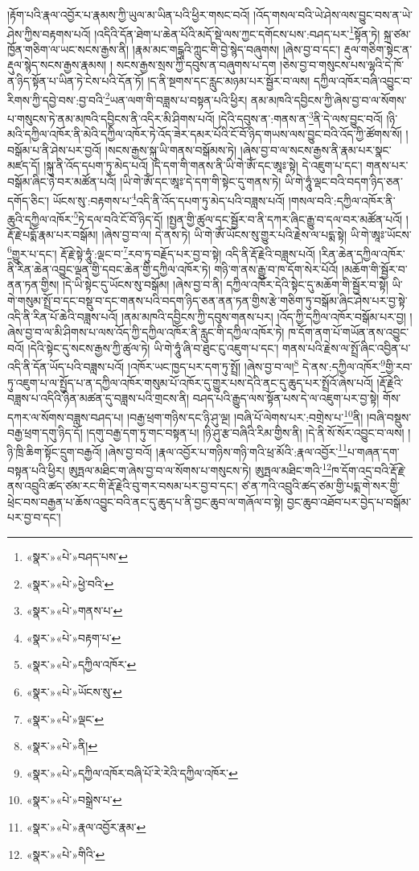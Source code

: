 །རྟོག་པའི་རྣལ་འབྱོར་པ་རྣམས་ཀྱི་ཡུལ་མ་ཡིན་པའི་ཕྱིར་གསང་བའོ། །འོད་གསལ་བའི་ཡེ་ཤེས་ལས་བྱུང་བས་ན་ཡེ་ཤེས་ཀྱིས་བརྟགས་པའོ། །འདིའི་དོན་ཐེག་པ་ཆེན་པོའི་མདོ་སྡེ་ལས་ཀྱང་དགོངས་པས་:བཤད་པར་\footnote{«སྣར་»«པེ་»བཤད་པས་}སྟོན་ཏེ། སྐྲ་ཙམ་ཁྱོན་གཅིག་ལ་ཡང་སངས་རྒྱས་ནི། །རྣམ་མང་གངྒཱའི་ཀླུང་གི་བྱེ་སྙེད་བཞུགས། །ཞེས་བྱ་བ་དང་། རྡུལ་གཅིག་སྟེང་ན་རྡུལ་སྙེད་སངས་རྒྱས་རྣམས། །
སངས་རྒྱས་སྲས་ཀྱི་དབུས་ན་བཞུགས་པ་དག །ཅེས་བྱ་བ་གསུངས་པས་ལྷའི་དེ་ཁོ་ན་ཉིད་སྟོན་པ་ཡིན་ཏེ་ངེས་པའི་དོན་ཏོ། །ད་ནི་སྔགས་དང་རླུང་མཉམ་པར་སྦྱོར་བ་ལས། དཀྱིལ་འཁོར་བཞི་འབྱུང་བ་རིགས་ཀྱི་དབྱེ་བས་:བྱ་བའི་\footnote{«སྣར་»«པེ་»ཕྱེ་བའི་}ཡན་ལག་གི་བཟླས་པ་བསྟན་པའི་ཕྱིར། ནམ་མཁའི་དབྱིངས་ཀྱི་ཞེས་བྱ་བ་ལ་སོགས་པ་གསུངས་ཏེ་ནམ་མཁའི་དབྱིངས་ནི་འདིར་མི་ཤིགས་པའོ། །དེའི་དབུས་ན་:གནས་ན་\footnote{«སྣར་»«པེ་»གནས་པ་}ནི་དེ་ལས་བྱུང་བའོ། །ཉི་མའི་དཀྱིལ་འཁོར་ནི་མེའི་དཀྱིལ་འཁོར་ཏེ་འོད་ཟེར་དམར་པོའི་ངོ་བོ་ཉིད་གཡས་ལས་བྱུང་བའི་འོད་ཀྱི་ཚོགས་སོ། །བསྒོམ་པ་ནི་ཤེས་པར་བྱའོ། །སངས་རྒྱས་སྐུ་ཡི་གནས་བསྒོམས་ཏེ། །ཞེས་བྱ་བ་ལ་སངས་རྒྱས་ནི་རྣམ་པར་སྣང་མཛད་དོ། །སྐུ་ནི་འོད་དཔག་ཏུ་མེད་པའོ། །དེ་དག་གི་གནས་ནི་ཡི་གེ་ཨོཾ་དང་ཨཱཿ་སྟེ། དེ་འཇུག་པ་དང་། གནས་པར་བསྒོམ་ཞིང་ཉེ་བར་མཚོན་པའོ། །ཡི་གེ་ཨོཾ་དང་ཨཱཿ་དེ་དག་གི་སྟེང་དུ་གནས་ཏེ། ཡི་གེ་ཧཱུཾ་ལྡང་བའི་བདག་ཉིད་ཅན་དགོད་ཅིང་། ཡོངས་སུ་:བརྟགས་པ་\footnote{«སྣར་»«པེ་»བརྟག་པ་}འདི་ནི་འོད་དཔག་ཏུ་མེད་པའི་བཟླས་པའོ། །གསལ་བའི་:དཀྱིལ་འཁོར་ནི་ཆུའི་དཀྱིལ་འཁོར་\footnote{«སྣར་»«པེ་»དཀྱིལ་འཁོར་}ཏེ་དལ་བའི་ངོ་བོ་ཉིད་དོ། །སྤྱན་གྱི་ཚུལ་དང་སྦྱོར་བ་ནི་དཀར་ཞིང་རྒྱུ་བ་དལ་བར་མཚོན་པའོ། །རྡོ་རྗེ་པདྨོ་རྣམ་པར་བསྒོམ། །ཞེས་བྱ་བ་ལ། དེ་ནས་ཏེ། ཡི་གེ་ཨོཾ་ཡོངས་སུ་གྱུར་པའི་རྗེས་ལ་པདྨ་སྟེ། ཡི་གེ་ཨཱཿ་ཡོངས་\footnote{«སྣར་»«པེ་»ཡོངས་སུ་}གྱུར་པ་དང་། རྡོ་རྗེ་སྟེ་ཧཱུཾ་:ལྡང་བ་\footnote{«སྣར་»«པེ་»ལྡང་}རབ་ཏུ་བརྗོད་པར་བྱ་བ་སྟེ། འདི་ནི་རྡོ་རྗེའི་བཟླས་པའོ། །རིན་ཆེན་དཀྱིལ་འཁོར་ནི་རིན་ཆེན་འབྱུང་ལྡན་གྱི་དབང་ཆེན་གྱི་དཀྱིལ་འཁོར་ཏེ། གཉི་ག་ནས་རྒྱུ་བ་ཁ་དོག་སེར་པོའོ། །མཆོག་གི་སྦྱོར་བ་ནན་ཏན་གྱིས། །དེ་ཡི་སྟེང་དུ་ཡོངས་སུ་བསྒོམ། །ཞེས་བྱ་བ་ནི། དཀྱིལ་འཁོར་དེའི་སྟེང་དུ་མཆོག་གི་སྦྱོར་བ་སྟེ། ཡི་གེ་གསུམ་སྤྲོ་བ་དང་བསྡུ་བ་དང་གནས་པའི་བདག་ཉིད་ཅན་ནན་ཏན་གྱིས་རྩེ་གཅིག་ཏུ་བསྒོམ་ཞིང་ཤེས་པར་བྱ་སྟེ་འདི་ནི་རིན་པོ་ཆེའི་བཟླས་པའོ། །ནམ་མཁའི་དབྱིངས་ཀྱི་དབུས་གནས་པར། །འོད་ཀྱི་དཀྱིལ་འཁོར་བསྒོམ་པར་བྱ། །ཞེས་བྱ་བ་ལ་མི་ཤིགས་པ་ལས་འོད་ཀྱི་དཀྱིལ་འཁོར་ནི་རླུང་གི་དཀྱིལ་འཁོར་ཏེ། ཁ་དོག་ནག་པོ་གཡོན་ནས་འབྱུང་བའོ། །དེའི་སྟེང་དུ་སངས་རྒྱས་ཀྱི་ཚུལ་ཏེ། ཡི་གེ་ཧཱུཾ་ཞི་བ་ཐུང་ངུ་འཇུག་པ་དང་། གནས་པའི་རྗེས་ལ་སྤྲོ་ཞིང་འབྱིན་པ་འདི་ནི་དོན་ཡོད་པའི་བཟླས་པའོ། །འཁོར་ཡང་ཁྱད་པར་དག་ཏུ་སྤྲོ། །ཞེས་བྱ་བ་ལ།\footnote{«སྣར་»«པེ་»ནི།} དེ་ནས་:དཀྱིལ་འཁོར་\footnote{«སྣར་»«པེ་»དཀྱིལ་འཁོར་བཞི་པོ་རེ་རེའི་དཀྱིལ་འཁོར་}གྱི་རབ་ཏུ་འཇུག་པ་ལ་སྤྱོད་པ་ན་དཀྱིལ་འཁོར་གསུམ་པོ་འཁོར་དུ་གྱུར་པས་དེའི་ནང་དུ་ཆུད་པར་སྤྲོའོ་ཞེས་པའོ། །རྡོ་རྗེའི་བཟླས་པ་འདིའི་ཉིན་མཚན་དུ་བཟླས་པའི་གྲངས་ནི། བཤད་པའི་རྒྱུད་ལས་སྟོན་པས་དེ་ལ་འཇུག་པར་བྱ་སྟེ། གོས་དཀར་ལ་སོགས་བཟླས་བཤད་པ། །བརྒྱ་ཕྲག་གཉིས་དང་ཉི་ཤུ་ལྔ། །བཞི་པོ་ལེགས་པར་:བགྲེས་པ་\footnote{«སྣར་»«པེ་»བསྒྲེས་པ་}ནི། །བཞི་བསྡུས་བརྒྱ་ཕྲག་དགུ་ཉིད་དོ། །དགུ་བརྒྱ་དག་ཏུ་གང་བསྟན་པ། །ཉི་ཤུ་རྩ་བཞིའི་རིམ་གྱིས་ནི། །དེ་ནི་སོ་སོར་འབྱུང་བ་ལས། །ཉི་ཁྲི་ཆིག་སྟོང་དྲུག་བརྒྱའོ། །ཞེས་བྱ་བའོ། །རྣལ་འབྱོར་པ་གཉིས་གཉི་གའི་ཕྲ་མོའི་:རྣལ་འབྱོར་\footnote{«སྣར་»«པེ་»རྣལ་འབྱོར་རྣམ་}པ་གཞན་དག་བསྟན་པའི་ཕྱིར། ཨུཏྤལ་མཐིང་ག་ཞེས་བྱ་བ་ལ་སོགས་པ་གསུངས་ཏེ། ཨུཏྤལ་མཐིང་གའི་\footnote{«སྣར་»«པེ་»གིའི་}ཁ་དོག་འདྲ་བའི་རྡོ་རྗེ་ནས་འབྲུའི་ཚད་ཙམ་རང་གི་རྡོ་རྗེའི་བུ་གར་བསམ་པར་བྱ་བ་དང་། ཙ་ན་ཀའི་འབྲུའི་ཚད་ཙམ་གྱི་པདྨ་གེ་སར་གྱི་ཕྲེང་བས་བརྒྱན་པ་ཆོས་འབྱུང་བའི་ནང་དུ་ཆུད་པ་ནི་བྱང་ཆུབ་ལ་གཞོལ་བ་སྟེ། བྱང་ཆུབ་འཐོབ་པར་བྱེད་པ་བསྒོམ་པར་བྱ་བ་དང་། 